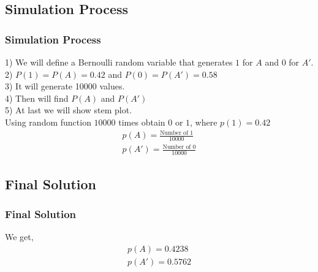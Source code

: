 \documentclass{beamer}
\providecommand{\brak}[1]{\ensuremath{\left(#1\right)}}
\theoremstyle{remark}
\numberwithin{equation}{section}
\begin{document}
\subsection{Simulation Process}
\begin{frame}
\frametitle{Simulation Process}

    1) We will define a Bernoulli random variable that generates $1$ for $A$ and $0$ for $A'$.\\
    2) $P\brak{1}=P\brak{A}=0.42$ and $P\brak{0}=P\brak{A'}=0.58$ \\
    3) It will generate 10000 values.\\
    4) Then will find $P\brak{A}$ and $P\brak{A'}$\\
    5) At last we will show stem plot.\\
    Using random function $10000$ times obtain $0$ or $1$, where $p\brak{1}=0.42$ 
\begin{align}
    p\brak{A}=\frac{\text{Number of 1}}{10000}\\
        p\brak{A'}=\frac{\text{Number of 0}}{10000}
\end{align}

\end{frame}


\subsection{Final Solution}
\begin{frame}
\frametitle{Final Solution}
We get,
    \begin{align}
        p\brak{A}=0.4238 \\
        p\brak{A'}=0.5762
    \end{align}
\end{frame}
\end{document}
